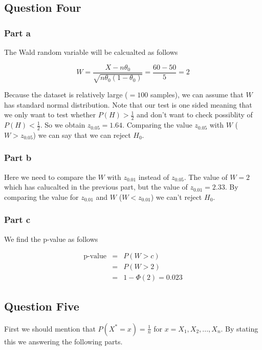 \documentclass[12pt, a4paper]{book}
\begin{document}
\subsection*{Question Four}

\subsubsection*{Part a}

The Wald random variable will be calcualted as follows

$$W = \frac{X - n\theta_0}{\sqrt{n\theta_0(1-\theta_0)}} = \frac{60 - 50}{5} = 2$$

Because the dataset is relatively large ($=100$ samples), we can assume that $W$ has standard normal distribution.
Note that our test is one sided meaning that we only want to test whether $P(H) > \frac{1}{2}$ and don't want to check
possiblity of $P(H) < \frac{1}{2}$. So we obtain $z_{0.05} = 1.64$. Comparing the value $z_{0.05}$ with
$W$ ($W > z_{0.05}$) we can say that we can reject $H_0$.

\subsubsection*{Part b}

Here we need to compare the $W$ with $z_{0.01}$ instead of $z_{0.05}$. The value of $W=2$ which has
calucalted in the previous part, but the value of $z_{0.01} = 2.33$. By comparing the value for
$z_{0.01}$ and $W$ ($W < z_{0.01}$) we can't reject $H_0$.

\subsubsection*{Part c}

We find the p-value as follows

\begin{eqnarray*}
    \text{p-value} & = & P(W > c) \\
    & = & P(W > 2) \\
    & = & 1 - \Phi(2) = 0.023
\end{eqnarray*}


\subsection*{Question Five}

First we should mention that $P(X^* = x) = \frac{1}{n}$ for $x=X_1, X_2, ..., X_n$.
By stating this we answering the following parts.
\end{document}
